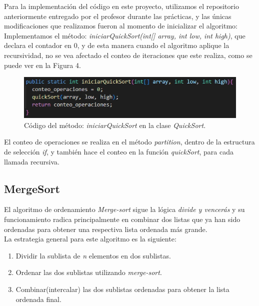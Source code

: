 \documentclass[a4paper,12pt]{article}
\begin{document}
Para la implementación del código en este proyecto, utilizamos el repositorio anteriormente entregado por el profesor durante las prácticas, y las únicas modificaciones que realizamos fueron al momento de inicializar el algoritmo:\\

Implementamos el método: \textit{iniciarQuickSort(int[] array, int low, int high)}, que declara el contador en 0, y de esta manera cuando el algoritmo aplique la recursividad, no se vea afectado el conteo de iteraciones que este realiza, como se puede ver en la Figura 4.\\

\begin{figure}[h]
    \centering
    \includegraphics[width=0.8\linewidth]{media/QuickSort_MetodoIniciar.PNG}
    \caption{Código del método: \textit{iniciarQuickSort} en la clase \textit{QuickSort}.}
    \label{fig:iniciarquick}
\end{figure}

El conteo de operaciones se realiza en el método \textit{partition}, dentro de la estructura de selección \textit{if}, y también hace el conteo en la función \textit{quickSort}, para cada llamada recursiva.

\subsection{MergeSort}

El algoritmo de ordenamiento \textit{Merge-sort} sigue la lógica \textit{divide y vencerás} y su funcionamiento radica principalmente en combinar dos listas que ya han sido ordenadas para obtener una respectiva lista ordenada más grande.\\

La estrategia general para este algoritmo es la siguiente:

\begin{enumerate}
    \item Dividir la sublista de \textit{n} elementos en dos sublistas.
    \item Ordenar las dos sublistas utilizando \textit{merge-sort}.
    \item Combinar(intercalar) las dos sublistas ordenadas para obtener la lista ordenada final.
\end{enumerate}
\end{document}
